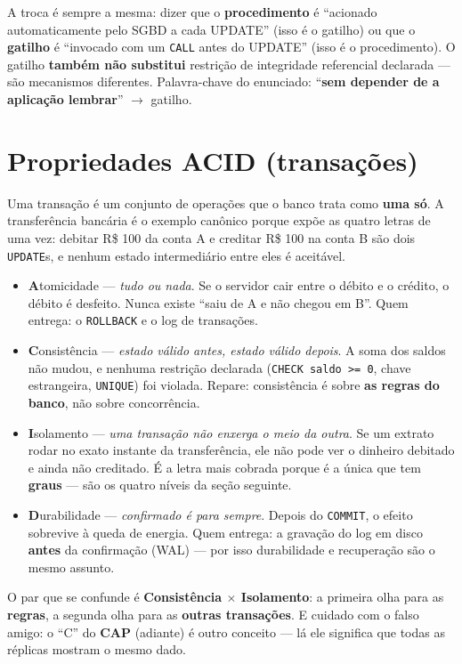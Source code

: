 \begin{pegadinha}
A troca é sempre a mesma: dizer que o \textbf{procedimento} é ``acionado
automaticamente pelo SGBD a cada UPDATE'' (isso é o gatilho) ou que o
\textbf{gatilho} é ``invocado com um \texttt{CALL} antes do UPDATE'' (isso é o
procedimento). O gatilho \textbf{também não substitui} restrição de
integridade referencial declarada --- são mecanismos diferentes. Palavra-chave
do enunciado: ``\textbf{sem depender de a aplicação lembrar}'' $\to$ gatilho.
\end{pegadinha}

\section{Propriedades ACID (transações)}

Uma transação é um conjunto de operações que o banco trata como \textbf{uma
só}. A transferência bancária é o exemplo canônico porque expõe as quatro
letras de uma vez: debitar R\$ 100 da conta A e creditar R\$ 100 na conta B
são dois \texttt{UPDATE}s, e nenhum estado intermediário entre eles é
aceitável.

\begin{conceito}
\begin{itemize}
\item \textbf{A}tomicidade --- \emph{tudo ou nada}. Se o servidor cair entre o
débito e o crédito, o débito é desfeito. Nunca existe ``saiu de A e não chegou
em B''. Quem entrega: o \texttt{ROLLBACK} e o log de transações.
\item \textbf{C}onsistência --- \emph{estado válido antes, estado válido
depois}. A soma dos saldos não mudou, e nenhuma restrição declarada
(\texttt{CHECK saldo >= 0}, chave estrangeira, \texttt{UNIQUE}) foi violada.
Repare: consistência é sobre \textbf{as regras do banco}, não sobre
concorrência.
\item \textbf{I}solamento --- \emph{uma transação não enxerga o meio da
outra}. Se um extrato rodar no exato instante da transferência, ele não pode
ver o dinheiro debitado e ainda não creditado. É a letra mais cobrada porque é
a única que tem \textbf{graus} --- são os quatro níveis da seção seguinte.
\item \textbf{D}urabilidade --- \emph{confirmado é para sempre}. Depois do
\texttt{COMMIT}, o efeito sobrevive à queda de energia. Quem entrega: a
gravação do log em disco \textbf{antes} da confirmação (WAL) --- por isso
durabilidade e recuperação são o mesmo assunto.
\end{itemize}

O par que se confunde é \textbf{Consistência $\times$ Isolamento}: a primeira
olha para as \textbf{regras}, a segunda olha para as \textbf{outras
transações}. E cuidado com o falso amigo: o ``C'' do \textbf{CAP} (adiante) é
outro conceito --- lá ele significa que todas as réplicas mostram o mesmo
dado.
\end{conceito}

